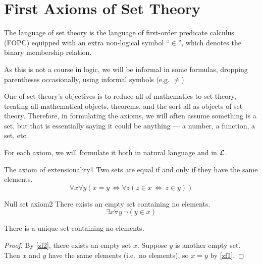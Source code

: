 \documentclass{styles/tufte}
\author{Jiaming (George) Yu}
\date{\today}
\begin{document}
\maketitle
\tableofcontents
\newpage



\section{First Axioms of Set Theory}

The language of set theory is the language of first-order predicate calculus (FOPC) equipped with an extra non-logical symbol ``$\in$'', which denotes the binary membership relation.

As this is not a course in logic, we will be informal in some formulas, dropping parentheses occasionally, using informal symbols (e.g. $\neq$)

One of set theory's objectives is to reduce all of mathematics to set theory, treating all mathematical objects, theorems, and the sort all as objects of set theory. Therefore, in formulating the axioms, we will often assume something is a set, but that is essentially saying it could be anything --- a number, a function, a set, etc.

For each axiom, we will formulate it both in natural language and in $\mathcal{L}$.

\begin{zf}{The axiom of extensionality}{1}
  Two sets are equal if and only if they have the same elements.
  \[ \forall x \forall y \left(x = y \,\iff \forall z (z \in x \,\iff\, z \in y)\right) \]
\end{zf}

\begin{zf}{Null set axiom}{2}
  There exists an empty set containing no elements.
  \[ \exists x \forall y \, \neg (y \in x) \]
\end{zf}

\begin{theorem}{}{}
  There is a unique set containing no elements.
\end{theorem}
\begin{proof}
  By \cref{zf2}, there exists an empty set $x$. Suppose $y$ is another empty set. Then $x$ and $y$ have the same elements (i.e.~no elements), so $x = y$ by \cref{zf1}.
\end{proof}
\end{document}
